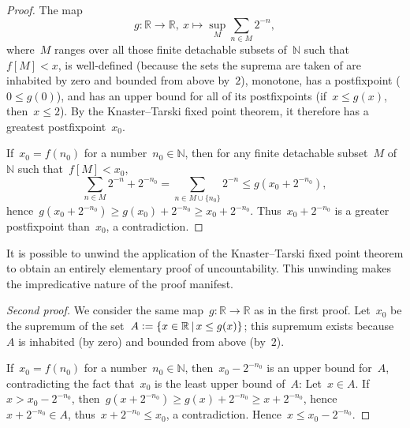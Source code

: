 \documentclass[oneside]{amsart}
\newcommand{\NN}{\mathbb{N}}
\newcommand{\RR}{\mathbb{R}}
\theoremstyle{definition}
\theoremstyle{plain}
\theoremstyle{remark}
\newcommand{\defeq}{\vcentcolon=}
\begin{document}
\begin{proof}The map
\[ g : \RR \longrightarrow \RR,\
  x \longmapsto \sup_M \sum_{n \in M} 2^{-n}, \]
where~$M$ ranges over all those finite detachable subsets of~$\NN$ such
that~$f[M] < x$, is well-defined (because the sets the suprema are taken of are
inhabited by zero and bounded from above by~$2$), monotone, has a postfixpoint
($0 \leq g(0)$), and has an upper bound for all of its postfixpoints (if~$x
\leq g(x)$, then~$x \leq 2$). By the Knaster--Tarski fixed point theorem, it
therefore has a greatest postfixpoint~$x_0$.

If~$x_0 = f(n_0)$ for a number~$n_0 \in \NN$, then for any finite detachable
subset~$M$ of~$\NN$ such that~$f[M] < x_0$,
\[ \sum_{n \in M} 2^{-n} + 2^{-n_0} = \sum_{n \in M \cup \{n_0\}} 2^{-n}
  \leq g(x_0 + 2^{-n_0}), \]
hence~$g(x_0 + 2^{-n_0}) \geq g(x_0) + 2^{-n_0} \geq x_0 + 2^{-n_0}$.
Thus~$x_0 + 2^{-n_0}$ is a greater postfixpoint than~$x_0$, a contradiction.
\end{proof}

It is possible to unwind the application of the Knaster--Tarski fixed point
theorem to obtain an entirely elementary proof of uncountability. This
unwinding makes the impredicative nature of the proof manifest.

\begin{proof}[Second proof]We consider the same map~$g : \RR \to \RR$ as in the
first proof. Let~$x_0$ be the supremum of the set~$A \defeq \{ x \in \RR \,|\,
x \leq g(x) \}$; this supremum exists because~$A$ is inhabited (by zero)
and bounded from above (by~$2$).

If~$x_0 = f(n_0)$ for a number~$n_0 \in \NN$, then~$x_0 - 2^{-n_0}$ is an
upper bound for~$A$, contradicting the fact that~$x_0$ is the least upper bound
of~$A$: Let~$x \in A$. If~$x > x_0 - 2^{-n_0}$, then~$g(x +
2^{-n_0}) \geq g(x) + 2^{-n_0} \geq x + 2^{-n_0}$, hence~$x + 2^{-n_0} \in A$,
thus~$x + 2^{-n_0} \leq x_0$, a contradiction. Hence~$x \leq x_0 - 2^{-n_0}$.
\end{proof}
\end{document}
